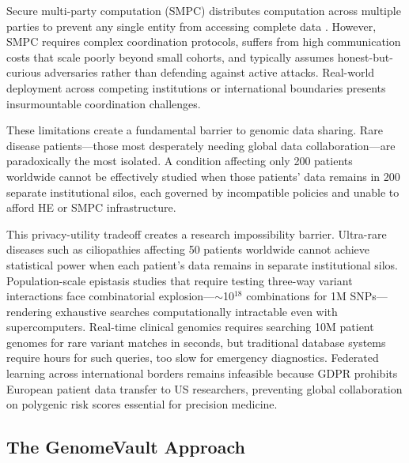 \documentclass[11pt,letterpaper]{article}
\begin{document}
Secure multi-party computation (SMPC) distributes computation across multiple parties to prevent any single entity from accessing complete data \cite{kamm2013}. However, SMPC requires complex coordination protocols, suffers from high communication costs that scale poorly beyond small cohorts, and typically assumes honest-but-curious adversaries rather than defending against active attacks. Real-world deployment across competing institutions or international boundaries presents insurmountable coordination challenges.

These limitations create a fundamental barrier to genomic data sharing. Rare disease patients---those most desperately needing global data collaboration---are paradoxically the most isolated. A condition affecting only 200 patients worldwide cannot be effectively studied when those patients' data remains in 200 separate institutional silos, each governed by incompatible policies and unable to afford HE or SMPC infrastructure.

This privacy-utility tradeoff creates a research impossibility barrier. Ultra-rare diseases such as ciliopathies affecting 50 patients worldwide cannot achieve statistical power when each patient's data remains in separate institutional silos. Population-scale epistasis studies that require testing three-way variant interactions face combinatorial explosion---$\sim$10$^{18}$ combinations for 1M SNPs---rendering exhaustive searches computationally intractable even with supercomputers. Real-time clinical genomics requires searching 10M patient genomes for rare variant matches in seconds, but traditional database systems require hours for such queries, too slow for emergency diagnostics. Federated learning across international borders remains infeasible because GDPR prohibits European patient data transfer to US researchers, preventing global collaboration on polygenic risk scores essential for precision medicine.

\subsection{The GenomeVault Approach}
\end{document}
